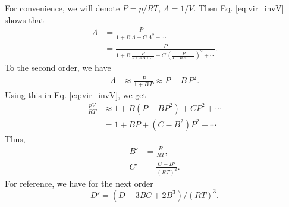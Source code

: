\documentclass[twocolumn, 10pt]{article}
\numberwithin{equation}{section}
\newenvironment{solution}[1][\empty]
{\par\medskip
  \textbf{\ifx\empty#1{Solution.}\relax\else{#1}\fi} \ignorespaces}
{\medskip}
\begin{document}
\begin{solution}
  For convenience, we will denote $P = p/RT$, $\Lambda = 1/V$.
  Then Eq. \eqref{eq:vir_invV} shows that
  \begin{align*}
    \Lambda
    &=
    \frac{ P } { 1 + B \, \Lambda + C \, \Lambda^2 + \cdots}
    \\
    &=
    \frac{ P } { 1 + B \, \frac{ P } { 1 + B \Lambda + \dots}
    + C \, \left( \frac{P}{1+B\,\Lambda+\cdots} \right)^2 + \cdots}
    .
  \end{align*}
  To the second order, we have
  \begin{align*}
    \Lambda
    &\approx
    \frac{ P } { 1 + B \, P}
    \approx
    P - B \, P^2
    .
  \end{align*}
  Using this in Eq. \eqref{eq:vir_invV}, we get
  \begin{align*}
  \frac{pV}{RT}
  &\approx
  1 + B (P - B P^2) + C P^2 + \cdots
  \\
  &=
  1 + B P + (C-B^2) P^2 + \cdots
  \end{align*}
  Thus,
  \begin{align*}
    B' &= \frac{B}{RT}, \\
    C' &= \frac{C - B^2}{(RT)^2}.
  \end{align*}
  For reference, we have for the next order
  $$
  D' = (D -3BC+2B^3)/(RT)^3.
  $$
\end{solution}
\end{document}
